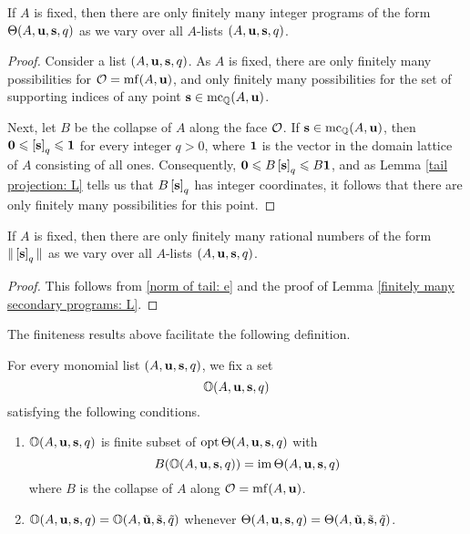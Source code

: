 \documentclass[11pt]{amsart}
\renewcommand{\!}[1]{{\color{red}\text{$\star$\,}#1\,$\star$}}
\begin{document}
\begin{lemma} 
\label{finitely many secondary programs: L} 
If $A$ is fixed, then there are only finitely many integer programs of the form $\Theta(A, \mathbf{u}, \mathbf{s}, q)$ as we vary over all $A$-lists $(A, \mathbf{u}, \mathbf{s}, q)$.
\end{lemma}

\begin{proof}  Consider a list $(A, \mathbf{u}, \mathbf{s}, q)$.  As $A$ is fixed, there are only finitely many possibilities for $\mathcal{O} = \operatorname{mf}(A, \mathbf{u})$, and only finitely many possibilities for the set of supporting indices of any point $\mathbf{s} \in \operatorname{mc}_{\mathbb{Q}}(A ,\mathbf{u})$.  

Next, let $B$ be the collapse of $A$ along the face $\mathcal{O}$.  If $\mathbf{s} \in \operatorname{mc}_{\mathbb{Q}}(A, \mathbf{u})$, then $\mathbf{0} \leqslant \left[ \mathbf{s} \right]_q \leqslant \mathbf{1}$ for every integer $q > 0$, where $\mathbf{1}$ is the vector in the domain lattice of $A$ consisting of all ones.  Consequently, $\mathbf{0} \leqslant B \left[ \mathbf{s} \right]_q \leqslant B \mathbf{1}$, and as Lemma \ref{tail projection: L} tells us that $B \left[ \mathbf{s} \right]_q$ has integer coordinates, it follows that there are only finitely many possibilities for this point.
 \end{proof}

\begin{corollary} 
\label{finitely many coord sums: C}
 If $A$ is fixed, then there are only finitely many rational numbers of the form $ \| \left[ \mathbf{s} \right]_q \|$ as we vary over all $A$-lists $(A, \mathbf{u}, \mathbf{s}, q)$.  
\end{corollary}

\begin{proof}  This follows from \eqref{norm of tail: e} and the proof of Lemma \ref{finitely many secondary programs: L}.
\end{proof}


The finiteness results above facilitate the following definition.



\newcommand{\orep}{\mathbb{O}}

\begin{definition}
\label{orep: D}

  For every monomial list $(A, \mathbf{u}, \mathbf{s}, q)$, we fix a set 
\[ \orep(A, \vv{u}, \vv{s}, q) \] satisfying the following conditions.
\begin{enumerate}
\item  $\orep(A, \vv{u}, \vv{s}, q)$ is finite subset of $\operatorname{opt} \Theta(A, \mathbf{u}, \mathbf{s}, q)$ with \[ B( \orep(A, \vv{u}, \vv{s}, q) ) = \im \ip(A, \vv{u}, \vv{s}, q) \]
where $B$ is the collapse of $A$ along $\mathcal{O} = \operatorname{mf}(A, \mathbf{u})$.
 
\item $\orep(A, \vv{u}, \vv{s}, q) = \orep(A, \tilde{\vv{u}}, \tilde{\vv{s}}, \tilde{q})$ whenever  
$\Theta(A, \mathbf{u}, \mathbf{s}, q) = \Theta(A, \tilde{\mathbf{u}}, \tilde{\mathbf{s}}, \tilde{q})$.
\end{enumerate} 
\end{definition}
\end{document}
